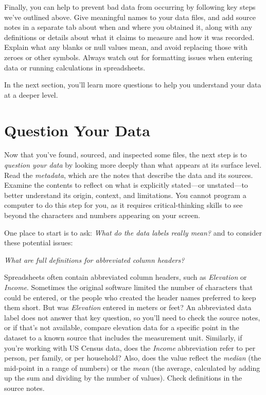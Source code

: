 \documentclass[
  english,
]{book}
\begin{document}
Finally, you can help to prevent bad data from occurring by following key steps we've outlined above. Give meaningful names to your data files, and add source notes in a separate tab about when and where you obtained it, along with any definitions or details about what it claims to measure and how it was recorded. Explain what any blanks or null values mean, and avoid replacing those with zeroes or other symbols. Always watch out for formatting issues when entering data or running calculations in spreadsheets.

In the next section, you'll learn more questions to help you understand your data at a deeper level.

\hypertarget{question}{%
\section*{Question Your Data}\label{question}}

Now that you've found, sourced, and inspected some files, the next step is to \emph{question your data} by looking more deeply than what appears at its surface level. Read the \emph{metadata}, which are the notes that describe the data and its sources. Examine the contents to reflect on what is explicitly stated---or unstated---to better understand its origin, context, and limitations. You cannot program a computer to do this step for you, as it requires critical-thinking skills to see beyond the characters and numbers appearing on your screen.

One place to start is to ask: \emph{What do the data labels really mean?} and to consider these potential issues:

\emph{What are full definitions for abbreviated column headers?}

Spreadsheets often contain abbreviated column headers, such as \emph{Elevation} or \emph{Income}. Sometimes the original software limited the number of characters that could be entered, or the people who created the header names preferred to keep them short. But was \emph{Elevation} entered in meters or feet? An abbreviated data label does not answer that key question, so you'll need to check the source notes, or if that's not available, compare elevation data for a specific point in the dataset to a known source that includes the measurement unit. Similarly, if you're working with US Census data, does the \emph{Income} abbreviation refer to per person, per family, or per household? Also, does the value reflect the \emph{median} (the mid-point in a range of numbers) or the \emph{mean} (the average, calculated by adding up the sum and dividing by the number of values). Check definitions in the source notes.
\end{document}
